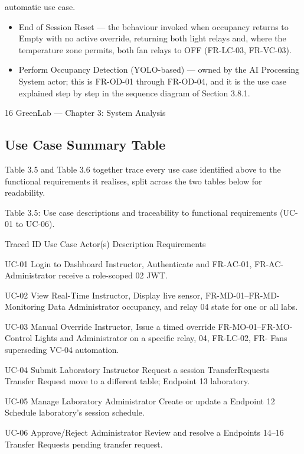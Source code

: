 automatic use case.

\begin{itemize}
  \item End of Session Reset --- the behaviour invoked when occupancy returns to Empty with no
active override, returning both light relays and, where the temperature zone permits, both
fan relays to OFF (FR-LC-03, FR-VC-03).
\end{itemize}

\begin{itemize}
  \item Perform Occupancy Detection (YOLO-based) --- owned by the AI Processing System
actor; this is FR-OD-01 through FR-OD-04, and it is the use case explained step by step in
the sequence diagram of Section 3.8.1.
\end{itemize}




16
GreenLab --- Chapter 3: System Analysis


\subsection{Use Case Summary Table}

Table 3.5 and Table 3.6 together trace every use case identified above to the functional
requirements it realises, split across the two tables below for readability.

Table 3.5: Use case descriptions and traceability to functional requirements (UC-01 to UC-06).

Traced
ID Use Case Actor(s) Description Requirements

UC-01 Login to Dashboard Instructor, Authenticate and FR-AC-01, FR-AC-
Administrator receive a role-scoped 02
JWT.

UC-02 View Real-Time Instructor, Display live sensor, FR-MD-01--FR-MD-
Monitoring Data Administrator occupancy, and relay 04
state for one or all
labs.

UC-03 Manual Override Instructor, Issue a timed override FR-MO-01--FR-MO-
Control Lights and Administrator on a specific relay, 04, FR-LC-02, FR-
Fans superseding VC-04
automation.

UC-04 Submit Laboratory Instructor Request a session TransferRequests
Transfer Request move to a different table; Endpoint 13
laboratory.

UC-05 Manage Laboratory Administrator Create or update a Endpoint 12
Schedule laboratory's session
schedule.

UC-06 Approve/Reject Administrator Review and resolve a Endpoints 14--16
Transfer Requests pending transfer
request.




